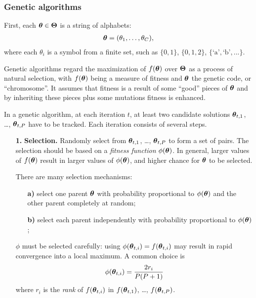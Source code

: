 \begin{frame}
  \frametitle{Genetic algorithms}
  First, each $\boldsymbol{\theta}\in\boldsymbol{\Theta}$ is a string of alphabets:
  \begin{align*}
    \boldsymbol{\theta}=({\theta}_1, \ldots, {\theta}_{C}),
  \end{align*}
  where each $\theta_i$ is a symbol from a finite set, such as $\{0,
  1\}$, $\{0,1,2\}$, $\{\text{`a'}, \text{`b'}, ...\}$.
  
  Genetic algorithms regard the maximization of $f(\boldsymbol{\theta})$ over
  $\boldsymbol{\Theta}$ as a process of natural selection, with $f(\boldsymbol{\theta})$
  being a measure of fitness and $\boldsymbol{\theta}$ the genetic code, or
  ``chromosome''.  It assumes that fitness is a result of some
  ``good'' pieces of $\boldsymbol{\theta}$ and by inheriting these pieces plus
  some mutations fitness is enhanced.

  In a genetic algorithm, at each iteration $t$, at least two
  candidate solutions $\boldsymbol{\theta}_{t,1}$, \ldots, $\boldsymbol{\theta}_{t,P}$
  have to be tracked.  Each iteration consists of several steps.

\end{frame}


\begin{frame}
  \begin{enumerate}
  \item[\bf 1.] \textbf{Selection.}  Randomly select from
    $\boldsymbol{\theta}_{t,1}$, \ldots, $\boldsymbol{\theta}_{t,P}$ to form a set of
    pairs.  The selection should be based on a \emph{fitness
      function\/} $\phi(\boldsymbol{\theta})$.  In general, larger values of
    $f(\boldsymbol{\theta})$ result in larger values of $\phi(\boldsymbol{\theta})$, and
    higher chance for $\boldsymbol{\theta}$ to be selected.

    There are many selection mechanisms:
    \begin{itemize}
    \item[\bf a)] select one parent $\boldsymbol{\theta}$ with probability
      proportional to $\phi(\boldsymbol{\theta})$ and the other parent
      completely at random;
    \item[\bf b)] select each parent independently with probability
      proportional to $\phi(\boldsymbol{\theta})$;
    \end{itemize}

    $\phi$ must be selected carefully: using
    $\phi(\boldsymbol{\theta}_{t,i})=f(\boldsymbol{\theta}_{t,i})$ may result in rapid
    convergence into a local maximum.  A common choice is
    \begin{align*}
      \phi(\boldsymbol{\theta}_{t,i}) = \frac{2r_i}{P(P+1)}
    \end{align*}
    where $r_i$ is the \emph{rank\/} of $f(\boldsymbol{\theta}_{t,i})$ in
    $f(\boldsymbol{\theta}_{t,1})$, \ldots, $f(\boldsymbol{\theta}_{t,P})$.
  \end{enumerate}
\end{frame}


